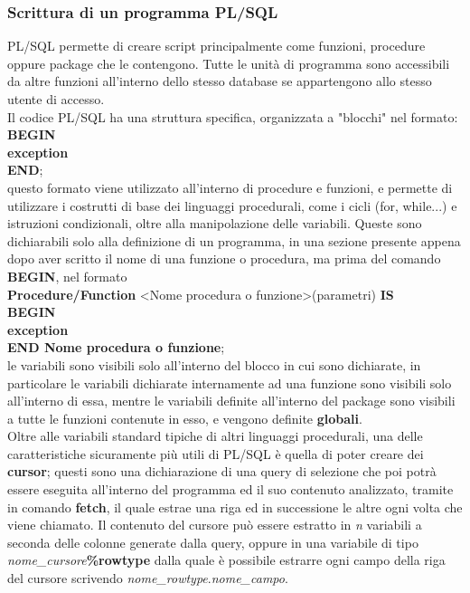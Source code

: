\subsubsection{Scrittura di un programma PL/SQL}
PL/SQL permette di creare script principalmente come funzioni, procedure oppure package che le contengono. Tutte le unità di programma sono accessibili da altre funzioni all'interno dello stesso database se appartengono allo stesso utente di accesso.\\
Il codice PL/SQL ha una struttura specifica, organizzata a "blocchi" nel formato:\\ \textbf{BEGIN}\newline [content] \\ \textbf{exception}\\ \textbf{END};\\ questo formato viene utilizzato all'interno di procedure e funzioni, e permette di utilizzare i costrutti di base dei linguaggi procedurali, come i cicli (for, while...) e istruzioni condizionali, oltre alla manipolazione delle variabili. Queste sono dichiarabili solo alla definizione di un programma, in una sezione presente appena dopo aver scritto il nome di una funzione o procedura, ma prima del comando \textbf{BEGIN}, nel formato\\ \textbf{Procedure/Function} <Nome procedura o funzione>(parametri) \textbf{IS}\\ \textbf{BEGIN}\newline [content]\\ \textbf{exception}\\ \textbf{END Nome procedura o funzione};\\ le variabili sono visibili solo all'interno del blocco in cui sono dichiarate, in particolare le variabili dichiarate internamente ad una funzione sono visibili solo all'interno di essa, mentre le variabili definite all'interno del package sono visibili a tutte le funzioni contenute in esso, e vengono definite \textbf{globali}.\\
Oltre alle variabili standard tipiche di altri linguaggi procedurali, una delle caratteristiche sicuramente più utili di PL/SQL è quella di poter creare dei \textbf{cursor}; questi sono una dichiarazione di una query di selezione che poi potrà essere eseguita all'interno del programma ed il suo contenuto analizzato, tramite in comando \textbf{fetch}, il quale estrae una riga ed in successione le altre ogni volta che viene chiamato. Il contenuto del cursore può essere estratto in \textit{n} variabili a seconda delle colonne generate dalla query, oppure in una variabile di tipo \textit{nome\_cursore}\textbf{\%rowtype} dalla quale è possibile estrarre ogni campo della riga del cursore scrivendo \textit{nome\_rowtype}.\textit{nome\_campo}.\\
